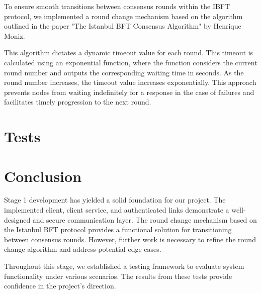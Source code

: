 \documentclass[12pt]{article}
\begin{document}
To ensure smooth transitions between consensus rounds within the IBFT protocol, we implemented a round change mechanism based on the algorithm outlined in the paper "The Istanbul BFT Consensus Algorithm" by Henrique Moniz.

This algorithm dictates a dynamic timeout value for each round. This timeout is calculated using an exponential function, where the function considers the current round number and outputs the corresponding waiting time in seconds.  As the round number increases, the timeout value increases exponentially. This approach prevents nodes from waiting indefinitely for a response in the case of failures and facilitates timely progression to the next round.

\section{Tests}

\section{Conclusion}

Stage 1 development has yielded a solid foundation for our project. The implemented client, client service, and authenticated links demonstrate a well-designed and secure communication layer. The round change mechanism based on the Istanbul BFT protocol provides a functional solution for transitioning between consensus rounds. However, further work is necessary to refine the round change algorithm and address potential edge cases.

Throughout this stage, we established a testing framework to evaluate system functionality under various scenarios. The results from these tests provide confidence in the project's direction.

\label{LastPage}
\end{document}

